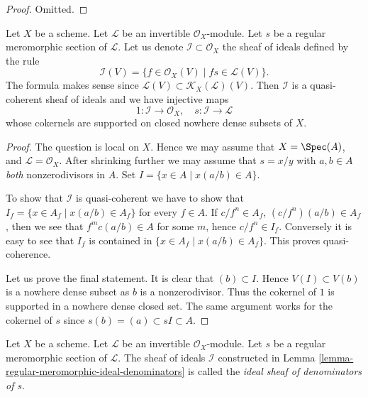 \begin{proof}
Omitted.
\end{proof}

\begin{lemma}
\label{lemma-regular-meromorphic-ideal-denominators}
Let $X$ be a scheme.
Let $\mathcal{L}$ be an invertible $\mathcal{O}_X$-module.
Let $s$ be a regular meromorphic section of $\mathcal{L}$.
Let us denote $\mathcal{I} \subset \mathcal{O}_X$ the
sheaf of ideals defined by the rule
$$
\mathcal{I}(V)
=
\{f \in \mathcal{O}_X(V) \mid fs \in \mathcal{L}(V)\}.
$$
The formula makes sense since
$\mathcal{L}(V) \subset \mathcal{K}_X(\mathcal{L})(V)$.
Then $\mathcal{I}$ is a quasi-coherent sheaf of ideals and
we have injective maps
$$
1 : \mathcal{I} \longrightarrow \mathcal{O}_X,
\quad
s : \mathcal{I} \longrightarrow \mathcal{L}
$$
whose cokernels are supported on closed nowhere dense subsets of $X$.
\end{lemma}

\begin{proof}
The question is local on $X$.
Hence we may assume that $X = \Spec(A)$,
and $\mathcal{L} = \mathcal{O}_X$. After shrinking further
we may assume that $s = x/y$ with $a, b \in A$ {\it both}
nonzerodivisors in $A$. Set $I = \{x \in A \mid x(a/b) \in A\}$.

\medskip\noindent
To show that $\mathcal{I}$ is quasi-coherent we have to show
that $I_f = \{x \in A_f \mid x(a/b) \in A_f\}$ for every
$f \in A$. If $c/f^n \in A_f$, $(c/f^n)(a/b) \in A_f$, then we see
that $f^mc(a/b) \in A$ for some $m$, hence $c/f^n \in I_f$.
Conversely it is easy to see that $I_f$ is contained in
$\{x \in A_f \mid x(a/b) \in A_f\}$. This proves quasi-coherence.

\medskip\noindent
Let us prove the final statement. It is clear that $(b) \subset I$.
Hence $V(I) \subset V(b)$ is a nowhere dense subset as $b$ is
a nonzerodivisor. Thus the cokernel of $1$ is supported in a nowhere
dense closed set. The same argument works for the cokernel
of $s$ since $s(b) = (a) \subset sI \subset A$.
\end{proof}

\begin{definition}
\label{definition-regular-meromorphic-ideal-denominators}
Let $X$ be a scheme.
Let $\mathcal{L}$ be an invertible $\mathcal{O}_X$-module.
Let $s$ be a regular meromorphic section of $\mathcal{L}$.
The sheaf of ideals $\mathcal{I}$ constructed in
Lemma \ref{lemma-regular-meromorphic-ideal-denominators}
is called the {\it ideal sheaf of denominators of $s$}.
\end{definition}




